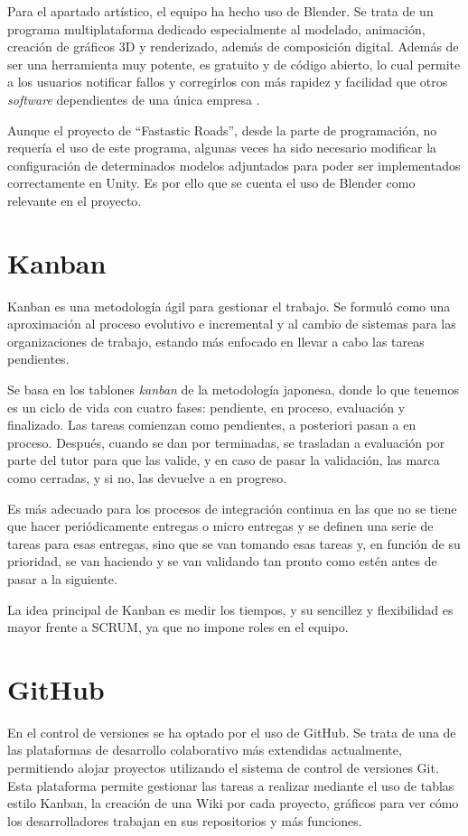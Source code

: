 Para el apartado artístico, el equipo ha hecho uso de Blender. Se trata de un programa multiplataforma dedicado especialmente al modelado, animación, creación de gráficos 3D y renderizado, además de composición digital. Además de ser una herramienta muy potente, es gratuito y de código abierto, lo cual permite a los usuarios notificar fallos y corregirlos con más rapidez y facilidad que otros \textit{software} dependientes de una única empresa \cite{blender}.

Aunque el proyecto de ``Fastastic Roads'', desde la parte de programación, no requería el uso de este programa, algunas veces ha sido necesario modificar la configuración de determinados modelos adjuntados para poder ser implementados correctamente en Unity. Es por ello que se cuenta el uso de Blender como relevante en el proyecto.

\section{Kanban}

Kanban es una metodología ágil para gestionar el trabajo. Se formuló como una aproximación al proceso evolutivo e incremental y al cambio de sistemas para las organizaciones de trabajo, estando más enfocado en llevar a cabo las tareas pendientes. 

Se basa en los tablones \textit{kanban} de la metodología japonesa, donde lo que tenemos es un ciclo de vida con cuatro fases: pendiente, en proceso, evaluación y finalizado. Las tareas comienzan como pendientes, a posteriori pasan a en proceso. Después, cuando se dan por terminadas, se trasladan a evaluación por parte del tutor para que las valide, y en caso de pasar la validación, las marca como cerradas, y si no, las devuelve a en progreso. 

Es más adecuado para los procesos de integración continua en las que no se tiene que hacer periódicamente entregas o micro entregas y se definen una serie de tareas para esas entregas, sino que se van tomando esas tareas y, en función de su prioridad, se van haciendo y se van validando tan pronto como estén antes de pasar a la siguiente. 

La idea principal de Kanban es medir los tiempos, y su sencillez y flexibilidad es mayor frente a SCRUM, ya que no impone roles en el equipo.

\section{GitHub}

En el control de versiones se ha optado por el uso de GitHub. Se trata de una de las plataformas de desarrollo colaborativo más extendidas actualmente, permitiendo alojar proyectos utilizando el sistema de control de versiones Git. Esta plataforma permite gestionar las tareas a realizar mediante el uso de tablas estilo Kanban, la creación de una Wiki por cada proyecto, gráficos para ver cómo los desarrolladores trabajan en sus repositorios y más funciones.